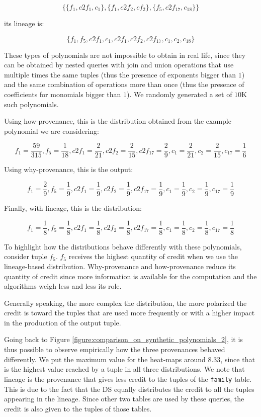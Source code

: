 {\footnotesize
\[
\{ \{f_1, c2f_1, c_1\}, \{f_1, c2f_2, cf_2\}, \{ f_5, c2f_{17}, c_{18}\} \}
\] 
}

its lineage is: 

{\footnotesize
\[
\{f_1, f_5, c2f_1, c_1, c2f_1, c2f_2, c2f_{17}, c_1, c_2, c_{18} \}
\]
 }
 
These types of polynomials are not impossible to obtain in real life, since they can be obtained by nested queries with join and union operations that use multiple times the same tuples (thus the presence of exponents bigger than $1$) and the same combination of operations more than once (thus the presence of coefficients for monomials bigger than $1$). 
We randomly generated a set of $10$K such polynomials. 

Using how-provenance, this is the distribution obtained from the example polynomial we are considering:

{\footnotesize
\[
f_1 = \frac{59}{315}, f_5 = \frac{1}{18}, c2f_1 = \frac{2}{21}, c2f_2 = \frac{2}{15}, 
c2f_{17}=\frac{2}{9} , c_1 = \frac{2}{21}, c_2 = \frac{2}{15}, c_{17} = \frac{1}{6} 
\]
}

Using why-provenance, this is the output:

{\footnotesize
\[
f_1 = \frac{2}{9}, f_5 = \frac{1}{9}, c2f_1 = \frac{1}{9}, c2f_2 = \frac{1}{9}, 
c2f_{17}=\frac{1}{9} , c_1 = \frac{1}{9}, c_2 = \frac{1}{9}, c_{17} = \frac{1}{9} 
\]
}


Finally, with lineage, this is the distribution:

{\footnotesize
\[
f_1 = \frac{1}{8}, f_5 = \frac{1}{8}, c2f_1 = \frac{1}{8}, c2f_2 = \frac{1}{8}, 
c2f_{17}=\frac{1}{8} , c_1 = \frac{1}{8}, c_2 = \frac{1}{8}, c_{17} = \frac{1}{8} 
\]
}

To highlight how the distributions behave differently with these polynomials, consider tuple $f_5$.
$f_5$ receives the highest quantity of credit when we use the lineage-based distribution. Why-provenance and how-provenance reduce its quantity of credit since more information is available for the computation and the algorithms weigh less and less its role. 

Generally speaking, the more complex the distribution, the more polarized the credit is toward the tuples that are used more frequently or with a higher impact in the production of the output tuple. 

Going back to Figure \ref{figure:comparison_on_synthetic_polynomials_2}, it is thus possible to observe empirically how the three provenances behaved differently. We put the maximum value for the heat-maps around $8.33$, since that is the highest value reached by a tuple in all three distributions. 
We note that lineage is the provenance that gives less credit to the tuples of the \texttt{family} table. This is due to the fact that the DS equally distributes the credit to all the tuples appearing in the lineage. Since other two tables are used by these queries, the credit is also given to the tuples of those tables. 

